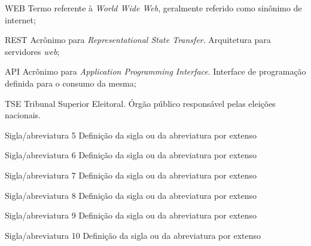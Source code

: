 \documentclass[
	12pt,				%
	oneside,			%
	a4paper,			%
	english,			%
	brazil				%
	]{abntex2ppgsi}
\begin{document}
%
%
\begin{siglas}
  \item[WEB] Termo referente à \textit{World Wide Web}, geralmente referido como sinônimo de internet;
  \item[REST] Acrônimo para \textit{Representational State Transfer}. Arquitetura para servidores \textit{web};
  \item[API] Acrônimo para \textit{Application Programming Interface}. Interface de programação definida para o consumo da mesma;
  \item[TSE] Tribunal Superior Eleitoral. Órgão público responsável pelas eleições nacionais.
  \item[Sigla/abreviatura 5] Definição da sigla ou da abreviatura por extenso
  \item[Sigla/abreviatura 6] Definição da sigla ou da abreviatura por extenso
  \item[Sigla/abreviatura 7] Definição da sigla ou da abreviatura por extenso
  \item[Sigla/abreviatura 8] Definição da sigla ou da abreviatura por extenso
  \item[Sigla/abreviatura 9] Definição da sigla ou da abreviatura por extenso
  \item[Sigla/abreviatura 10] Definição da sigla ou da abreviatura por extenso
\end{siglas}


\tableofcontents*
\cleardoublepage

\textual



% 
%
%
\end{document}
